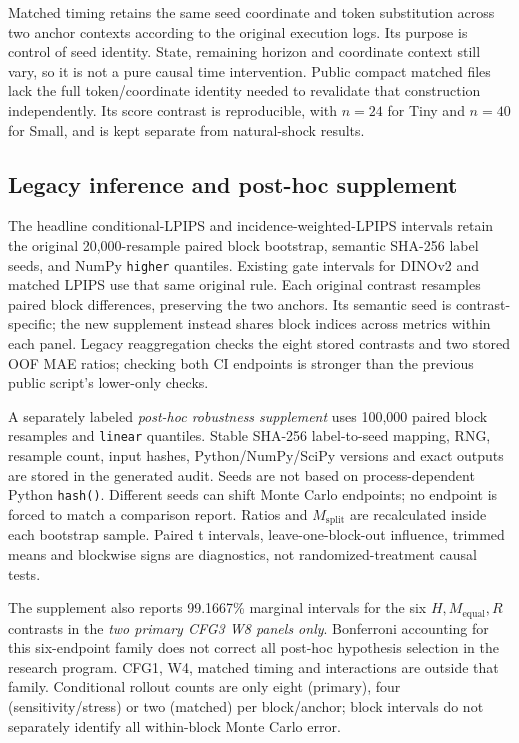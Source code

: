 \documentclass[11pt,a4paper]{article}
\theoremstyle{plain}
\theoremstyle{definition}
\theoremstyle{remark}
\newcommand{\Meq}{M_{\mathrm{equal}}}
\newcommand{\Msplit}{M_{\mathrm{split}}}
\begin{document}
Matched timing retains the same seed coordinate and token substitution across
two anchor contexts according to the original execution logs. Its purpose is
control of seed identity. State, remaining horizon and coordinate context still
vary, so it is not a pure causal time intervention. Public compact matched files
lack the full token/coordinate identity needed to revalidate that construction
independently. Its score contrast is reproducible, with $n=24$ for Tiny and
$n=40$ for Small, and is kept separate from natural-shock results.

\subsection{Legacy inference and post-hoc supplement}
\label{sec:stats}
The headline conditional-LPIPS and incidence-weighted-LPIPS intervals retain the
original 20,000-resample paired block bootstrap, semantic SHA-256 label seeds,
and NumPy \texttt{higher} quantiles. Existing gate intervals for DINOv2 and
matched LPIPS use that same original rule. Each original contrast resamples
paired block differences, preserving the two anchors. Its semantic seed is
contrast-specific; the new supplement instead shares block indices across
metrics within each panel. Legacy reaggregation
checks the eight stored contrasts and two stored OOF MAE ratios; checking both
CI endpoints is stronger than the previous public script's lower-only checks.

A separately labeled \emph{post-hoc robustness supplement} uses 100,000 paired
block resamples and \texttt{linear} quantiles. Stable SHA-256 label-to-seed
mapping, RNG, resample count, input hashes, Python/NumPy/SciPy versions and
exact outputs are stored in the generated audit. Seeds are not based on
process-dependent Python \texttt{hash()}. Different seeds can shift Monte Carlo
endpoints; no endpoint is forced to match a comparison report.
Ratios and $\Msplit$ are recalculated inside each bootstrap sample.
Paired t intervals, leave-one-block-out influence, trimmed means and blockwise
signs are diagnostics, not randomized-treatment causal tests.

The supplement also reports 99.1667\% marginal intervals for the six
$H,\Meq,R$ contrasts in the \emph{two primary CFG3 W8 panels only}.
Bonferroni accounting for this six-endpoint family does not correct all
post-hoc hypothesis selection in the research program. CFG1, W4, matched timing
and interactions are outside that family. Conditional rollout counts are only
eight (primary), four (sensitivity/stress) or two (matched) per block/anchor;
block intervals do not separately identify all within-block Monte Carlo error.
\end{document}
